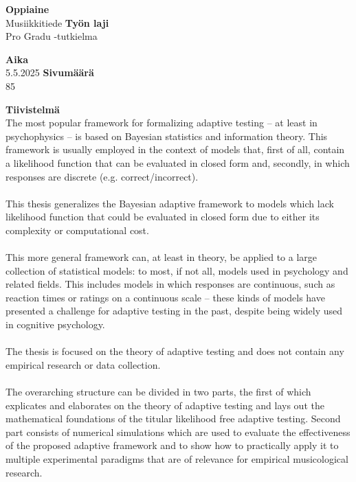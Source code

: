 \documentclass[]{scrartcl}
\begin{document}
\begin{tcbitemize}[
	raster equal height,raster force size=false,
	raster equal skip=0pt,raster column skip=0mm,raster columns=2]
	\tcbitem[width=0.5\linewidth]
	\textbf{Oppiaine}\\
	Musiikkitiede
	\tcbitem[width=0.5\linewidth]
	\textbf{Työn laji}\\
	Pro Gradu -tutkielma
\end{tcbitemize}

\begin{tcbitemize}[
	raster equal height,raster force size=true,
	raster equal skip=0pt,raster column skip=0mm,raster columns=2]
	\tcbitem[width=0.5\linewidth]
	\textbf{Aika}\\
	5.5.2025
	\tcbitem[width=0.5\linewidth]
	\textbf{Sivumäärä}\\
	85
\end{tcbitemize}

\begin{tcbitemize}[
	raster equal height,raster force size=false,
	raster equal skip=0pt,raster column skip=0mm,raster columns=1]
	\tcbitem[width=\linewidth]
	\textbf{Tiivistelmä}\\
	
	The most popular framework for formalizing adaptive testing -- at least in psychophysics -- is based on Bayesian statistics and information theory. This framework is usually employed in the context of models that, first of all, contain a likelihood function that can be evaluated in closed form and, secondly, in which responses are discrete (e.g. correct/incorrect).
	\\ \\
	This thesis generalizes the Bayesian adaptive framework to models which lack likelihood function that could be evaluated in closed form due to either its complexity or computational cost.
	\\ \\
	This more general framework can, at least in theory, be applied to a large collection of statistical models: to most, if not all, models used in psychology and related fields. This includes models in which responses are continuous, such as reaction times or ratings on a continuous scale -- these kinds of models have presented a challenge for adaptive testing in the past, despite being widely used in cognitive psychology. 
	\\ \\
	The thesis is focused on the theory of adaptive testing and does not contain any empirical research or data collection. 
	\\ \\
	The overarching structure can be divided in two parts, the first of which explicates and elaborates on the theory of adaptive testing and lays out the mathematical foundations of the titular likelihood free adaptive testing. Second part consists of numerical simulations which are used to evaluate the effectiveness of the proposed adaptive framework and to show how to practically apply it to multiple experimental paradigms that are of relevance for empirical musicological research.
	
\end{tcbitemize}
\end{document}
